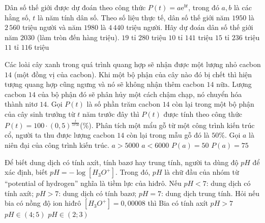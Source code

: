 \begin{ex}%
	 Dân số thế giới được dự đoán theo công thức $P(t)=a\mathrm{e}^{bt}$, trong đó $a,b$ là các hằng số, $t$ là năm tính dân số. Theo số liệu thực tế, dân số thế giới năm $1950$ là $2\,560$ triệu người và năm $1980$ là $4\,440$ triệu người. Hãy dự đoán dân số thế giới năm $2030$ (làm tròn đến hàng triệu).
	 \choice
		{$19$ tỉ $280$  triệu}
		{$10$ tỉ $141$ triệu} 
		{$15$ tỉ $236$ triệu} 
		{\True $11$ tỉ $116$ triệu} 
\end{ex}



\begin{ex}%
 Các loài cây xanh trong quá trình quang hợp sẽ nhận được một lượng nhỏ cacbon $14$ (một đồng vị của cacbon). Khi một bộ phận của cây nào đó bị chết thì hiện tượng quang hợp cũng ngưng và nó sẽ không nhận thêm cacbon $14$ nữa. Lượng cacbon $14$ của bộ phận đó sẽ phân hủy một cách chậm chạp, nó chuyển hóa thành nitơ $14$. Gọi $P(t)$ là số phần trăm cacbon $14$ còn lại trong một bộ phận của cây sinh trưởng từ $t$ năm trước  đây thì $P(t)$ được tính theo công thức $P(t)=100\cdot (0,5)^{\frac{t}{5750}}$(\%). Phân tích một mẩu gỗ từ một công trình kiến trúc cổ, người ta thu được lượng cacbon $14$ còn lại trong mẫu gỗ đó là $50\%$. Gọi $a$ là niên đại của công trình kiến trúc.
  \choiceTF
   {\True $a>5000$}
   {\True $a<6000$}
  {\True $P(a)=50$} 
   {$P(a)=75$}
\end{ex}

\begin{ex}%
 Để biết dung dịch có tính axít, tính bazơ hay trung tính, người ta dùng độ $pH$ để xác định, biết $pH=-\log\left[H_3O^+\right]$. Trong đó, $pH$ là chữ đầu của nhóm từ ``potential of hydrogen'' nghĩa là tiềm lực của  hiđrô. Nếu $pH<7$: dung dịch có tính axít; $pH>7$: dung dịch có tính bazơ; $pH=7$: dung dịch trung tính. Hỏi nếu bia có nồng độ ion hiđrô $\left[H_3O^+\right]=0,00008$ thì
 \choiceTF 
  {\True Bia có tính axít} 
  {$pH>7$} 
  {\True  $pH \in (4;5)$}
  {$pH\in  (2;3)$}
\end{ex}

